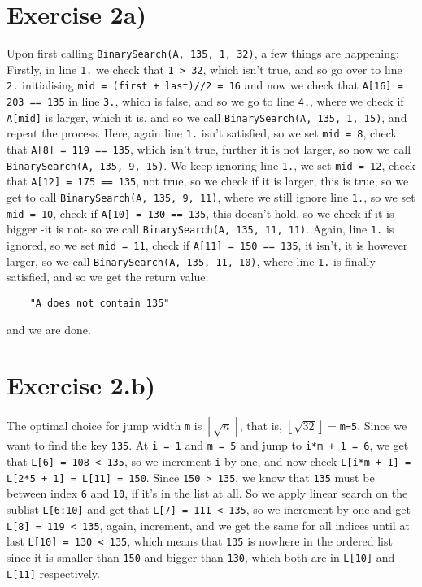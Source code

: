 \documentclass{article}
\begin{document}
\section*{Exercise 2a)}
Upon first calling  \texttt{BinarySearch(A, 135, 1, 32)}, a few things
are happening: Firstly, in line \texttt{1.} we check that  
\texttt{1 > 32}, which isn't true, and so go over to line  \texttt{2.}
initialising \texttt{mid =  (first + last)//2 = 16} and now we check
that \texttt{A[16] = 203 == 135} in line \texttt{3.}, which is false, 
and so we go to line  \texttt{4.}, where we check if \texttt{A[mid]} is
larger, which it is, and so we call \texttt{BinarySearch(A, 135, 1, 15)}, 
and repeat the process. Here, again line  \texttt{1.} isn't satisfied,
so we set \texttt{mid = 8}, check that \texttt{A[8] = 119 == 135}, which
isn't true, further it is not larger, so now  we call 
\texttt{BinarySearch(A, 135, 9, 15)}. 
We keep ignoring line \texttt{1.}, we set  \texttt{mid = 12}, check that 
\texttt{A[12] = 175 == 135}, not true, so we check if it is larger, this is
true, so we get to call 
\texttt{BinarySearch(A, 135, 9, 11)}, where we still ignore line 
\texttt{1.}, so we set \texttt{mid = 10}, check if
\texttt{A[10] = 130 == 135}, this doesn't hold, so we check if it is 
bigger -it is not- so we call \texttt{BinarySearch(A, 135, 11, 11)}.
Again, line  \texttt{1.}  is ignored, so we set \texttt{mid = 11}, check
if \texttt{A[11] = 150 == 135}, it isn't, it is however larger, so we call
\texttt{BinarySearch(A, 135, 11, 10)}, where line \texttt{1.} is finally
satisfied, and so we get the return value:
\begin{lstlisting}
    "A does not contain 135"
\end{lstlisting} and we are done.

\section*{Exercise 2.b)}
The optimal choice for jump width  \texttt{m} is $\left\lfloor 
\sqrt{n} \right\rfloor$, that is,  $\left\lfloor 
\sqrt{32} \right\rfloor = $\texttt{m=5}. Since we 
want to find the key \texttt{135}. At  \texttt{i = 1} and 
 \texttt{m = 5} and jump to \texttt{i*m + 1 = 6}, we get that 
 \texttt{L[6] = 108 < 135}, so we increment \texttt{i} by one, and now 
 check \texttt{L[i*m + 1] = L[2*5 + 1] = L[11] = 150}. Since  
 \texttt{150 > 135}, we know that \texttt{135} must be between index 
 \texttt{6} and \texttt{10}, if it's in the list at all.
 So we apply linear search on the sublist \texttt{L[6:10]} and get that
 \texttt{L[7] = 111 < 135}, so we increment by one and get 
 \texttt{L[8] = 119 < 135}, again, increment, and we get the same for 
 all indices until at last \texttt{L[10] = 130 < 135}, which means that
 \texttt{135} is nowhere in the ordered list since it is smaller than
 \texttt{150} and bigger than \texttt{130}, which both are in 
 \texttt{L[10]} and \texttt{L[11]} respectively.
\end{document}
